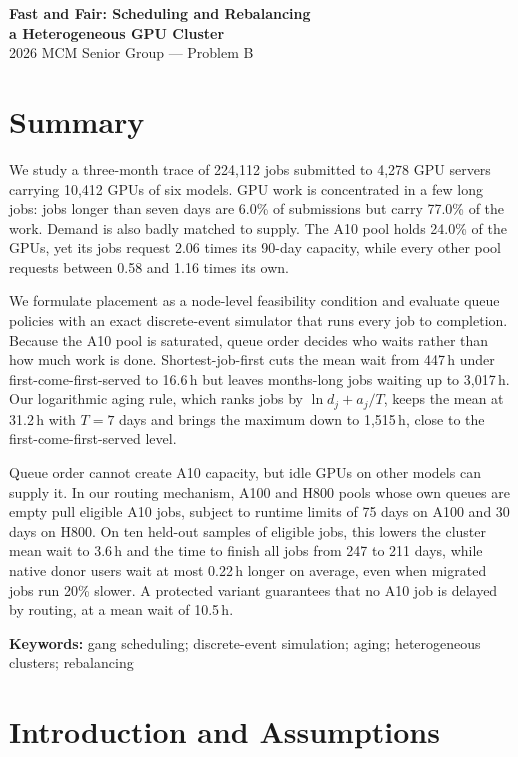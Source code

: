 \documentclass[11pt,a4paper]{article}
\begin{document}
\begin{center}
{\LARGE\bfseries Fast and Fair: Scheduling and Rebalancing\\[2pt] a Heterogeneous GPU Cluster}\\[6pt]
{\large 2026 MCM Senior Group --- Problem B}
\end{center}

\section*{Summary}

We study a three-month trace of 224,112 jobs submitted to 4,278 GPU servers carrying 10,412 GPUs of six models. GPU work is concentrated in a few long jobs: jobs longer than seven days are 6.0\% of submissions but carry 77.0\% of the work. Demand is also badly matched to supply. The A10 pool holds 24.0\% of the GPUs, yet its jobs request 2.06 times its 90-day capacity, while every other pool requests between 0.58 and 1.16 times its own.

We formulate placement as a node-level feasibility condition and evaluate queue policies with an exact discrete-event simulator that runs every job to completion. Because the A10 pool is saturated, queue order decides who waits rather than how much work is done. Shortest-job-first cuts the mean wait from 447\,h under first-come-first-served to 16.6\,h but leaves months-long jobs waiting up to 3,017\,h. Our logarithmic aging rule, which ranks jobs by $\ln d_j + a_j/T$, keeps the mean at 31.2\,h with $T=7$ days and brings the maximum down to 1,515\,h, close to the first-come-first-served level.

Queue order cannot create A10 capacity, but idle GPUs on other models can supply it. In our routing mechanism, A100 and H800 pools whose own queues are empty pull eligible A10 jobs, subject to runtime limits of 75 days on A100 and 30 days on H800. On ten held-out samples of eligible jobs, this lowers the cluster mean wait to 3.6\,h and the time to finish all jobs from 247 to 211 days, while native donor users wait at most 0.22\,h longer on average, even when migrated jobs run 20\% slower. A protected variant guarantees that no A10 job is delayed by routing, at a mean wait of 10.5\,h.

\noindent\textbf{Keywords:} gang scheduling; discrete-event simulation; aging; heterogeneous clusters; rebalancing

\section{Introduction and Assumptions}
\end{document}
